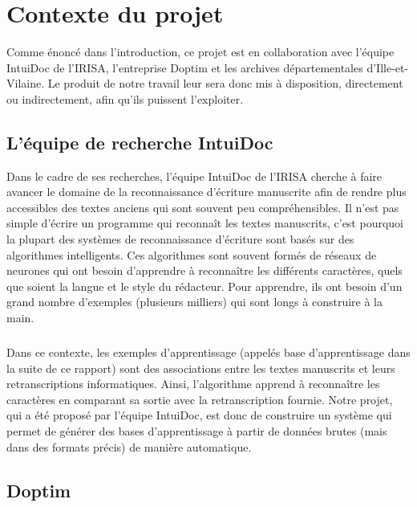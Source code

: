 \chapter{Contexte du projet}

Comme énoncé dans l’introduction, ce projet est en collaboration avec l’équipe IntuiDoc de l’IRISA,
l’entreprise Doptim et les archives départementales d'Ille-et-Vilaine. Le produit de notre travail
leur sera donc mis à disposition, directement ou indirectement, afin qu’ils puissent l’exploiter.

\section{L’équipe de recherche IntuiDoc}

Dans le cadre de ses recherches, l’équipe IntuiDoc de l’IRISA cherche à faire avancer le domaine
de la reconnaissance d’écriture manuscrite afin de rendre plus accessibles des textes anciens qui
sont souvent peu compréhensibles. Il n’est pas simple d’écrire un programme qui reconnaît les textes
manuscrits, c’est pourquoi la plupart des systèmes de reconnaissance d’écriture sont basés sur des
algorithmes intelligents. Ces algorithmes sont souvent formés de réseaux de neurones qui ont besoin
d’apprendre à reconnaître les différents caractères, quels que soient la langue et le style du rédacteur.
Pour apprendre, ils ont besoin d’un grand nombre d’exemples (plusieurs milliers) qui sont longs
à construire à la main. 

\paragraph{}
Dans ce contexte, les exemples d’apprentissage (appelés base d’apprentissage dans la suite de ce rapport)
sont des associations entre les textes manuscrits et leurs retranscriptions informatiques. Ainsi,
l’algorithme apprend à reconnaître les caractères en comparant sa sortie avec la retranscription fournie.
Notre projet, qui a été proposé par l’équipe IntuiDoc, est donc de construire un système qui
permet de générer des bases d’apprentissage à partir de données brutes (mais dans des formats précis)
de manière automatique.

\section{Doptim}

